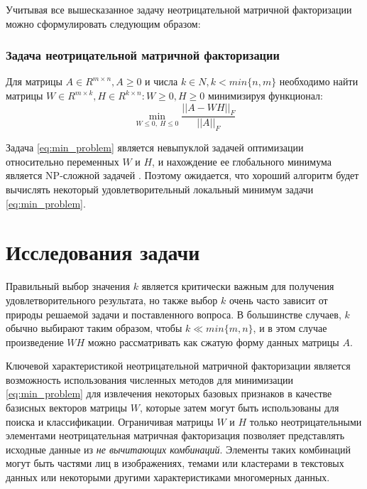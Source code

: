 \newpage

Учитывая все вышесказанное задачу неотрицательной матричной факторизации можно сформулировать следующим образом:

\subsubsection{Задача неотрицательной матричной факторизации}

Для матрицы $A \in R^{m \times n}, A \geq 0$ и числа $k \in N, k < min\{n, m\}$
необходимо найти матрицы $W \in R^{m \times k}, H \in R^{k \times n} : W \geq 0, H \geq 0$ минимизируя функционал:
\begin{equation} \label{eq:min_problem}
  \min_{W \leq 0, \ H \leq 0} \dfrac{||A - WH||_F}{|| A ||_F}
\end{equation}

Задача \ref{eq:min_problem} является невыпуклой задачей оптимизации относительно переменных $W$ и $H$,
и нахождение ее глобального минимума является NP-сложной задачей \cite{vavaris}.
Поэтому ожидается, что хороший алгоритм будет вычислять некоторый удовлетворительный локальный минимум задачи \ref{eq:min_problem}.






\section{Исследования задачи}

Правильный выбор значения $k$ является критически важным для получения удовлетворительного результата,
но также выбор $k$ очень часто зависит от природы решаемой задачи и поставленного вопроса.
В большинстве случаев, $k$ обычно выбирают таким образом, чтобы $k \ll min\{m, n\}$,
и в этом случае произведение $WH$ можно рассматривать как сжатую форму данных матрицы $A$.

Ключевой характеристикой неотрицательной матричной факторизации является возможность
использования численных методов для минимизации \ref{eq:min_problem}
для извлечения некоторых базовых признаков в качестве базисных векторов матрицы $W​$,
которые затем могут быть использованы для поиска и классификации.
Ограничивая матрицы $W​$ и $H​$ только неотрицательными элементами
неотрицательная матричная факторизация позволяет представлять исходные данные из \textit{не вычитающих комбинаций}.
Элементы таких комбинаций могут быть частями лиц в изображениях, темами или кластерами в текстовых данных
или некоторыми другими характеристиками многомерных данных.

